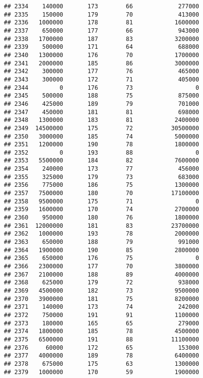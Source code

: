 \documentclass[
]{article}
\begin{document}
\begin{verbatim}
## 2334    140000       173        66             277000
## 2335    150000       179        70             413000
## 2336   1000000       178        81            1600000
## 2337    650000       177        66             943000
## 2338   1700000       187        83            3200000
## 2339    500000       171        64             688000
## 2340   1300000       176        70            1700000
## 2341   2000000       185        86            3000000
## 2342    300000       177        76             465000
## 2343    300000       172        71             405000
## 2344         0       176        73                  0
## 2345    500000       188        75             875000
## 2346    425000       189        79             701000
## 2347    450000       181        81             698000
## 2348   1300000       183        81            2400000
## 2349  14500000       175        72           30500000
## 2350   3000000       185        74            5000000
## 2351   1200000       190        78            1800000
## 2352         0       193        88                  0
## 2353   5500000       184        82            7600000
## 2354    240000       173        77             456000
## 2355    325000       179        73             683000
## 2356    775000       186        75            1300000
## 2357   7500000       180        70           17100000
## 2358   9500000       175        71                  0
## 2359   1600000       170        74            2700000
## 2360    950000       180        76            1800000
## 2361  12000000       181        83           23700000
## 2362   1000000       193        78            2000000
## 2363    650000       188        79             991000
## 2364   1900000       190        85            2800000
## 2365    650000       176        75                  0
## 2366   2300000       177        70            3800000
## 2367   2100000       188        89            4000000
## 2368    625000       179        72             938000
## 2369   4500000       182        73            9500000
## 2370   3900000       181        75            8200000
## 2371    140000       173        74             242000
## 2372    750000       191        91            1100000
## 2373    180000       165        65             279000
## 2374   1800000       185        78            4500000
## 2375   6500000       191        88           11100000
## 2376     60000       172        65             153000
## 2377   4000000       189        78            6400000
## 2378    675000       175        63            1300000
## 2379   1000000       170        59            1900000

\end{verbatim}
\end{document}
